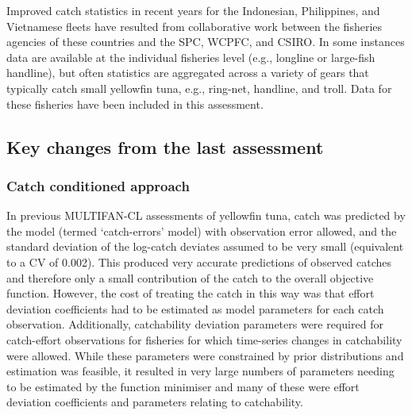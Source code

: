 Improved catch statistics in recent years for the Indonesian, Philippines, and Vietnamese fleets have resulted from collaborative work between the fisheries agencies of these countries and the SPC, WCPFC, and CSIRO. In some instances data are available at the individual fisheries level (e.g., longline or large-fish handline), but often statistics are aggregated across a variety of gears that typically catch small yellowfin tuna, e.g., ring-net, handline, and troll. Data for these fisheries have been included in this assessment.

\subsection{Key changes from the last assessment}
\label{sec:key_changes}

\subsubsection{Catch conditioned approach}
\label{sec:catch_cond}

In previous MULTIFAN-CL assessments of yellowfin tuna, catch was predicted by the model (termed `catch-errors' model) with observation error allowed, and the standard deviation of the log-catch deviates assumed to be very small (equivalent to a CV of 0.002). This produced very accurate predictions of observed catches and therefore only a small contribution of the catch to the overall objective function. However, the cost of treating the catch in this way was that effort deviation coefficients had to be estimated as model parameters for each catch observation. Additionally, catchability deviation parameters were required for catch-effort observations for fisheries for which time-series changes in catchability were allowed. While these parameters were constrained by prior distributions and estimation was feasible, it resulted in very large numbers of parameters needing to be estimated by the function minimiser and many of these were effort deviation coefficients and parameters relating to catchability.

